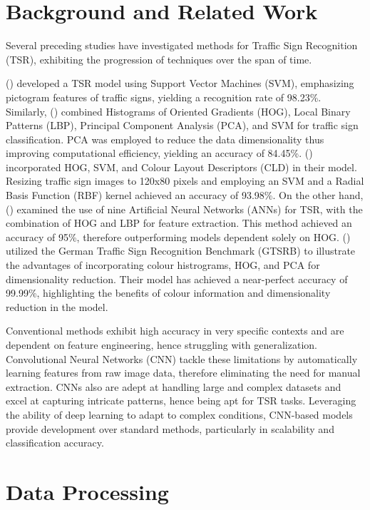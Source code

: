 \documentclass{article} %
\begin{document}
\section{Background and Related Work}
Several preceding studies have investigated methods for Traffic Sign Recognition (TSR), exhibiting the progression of techniques over the span of time. 

\citeauthor{Madani}(\citeyear{Madani}) developed a TSR model using Support Vector Machines (SVM), emphasizing pictogram features of traffic signs, yielding a recognition rate of 98.23\%. Similarly, \citeauthor{soni2019improving} (\citeyear{soni2019improving}) combined Histograms of Oriented Gradients (HOG), Local Binary Patterns (LBP), Principal Component Analysis (PCA), and SVM for traffic sign classification. PCA was employed to reduce the data dimensionality thus improving computational efficiency, yielding an accuracy of 84.45\%. \citeauthor{Namyang} (\citeyear{Namyang}) incorporated HOG, SVM, and Colour Layout Descriptors (CLD) in their model. Resizing traffic sign images to 120x80 pixels and employing an SVM and a Radial Basis Function (RBF) kernel achieved an accuracy of 93.98\%. On the other hand, \citeauthor{kerim} (\citeauthor{kerim}) examined the use of nine Artificial Neural Networks (ANNs) for TSR, with the combination of HOG and LBP for feature extraction. This method achieved an accuracy of 95\%, therefore outperforming models dependent solely on HOG. \citeauthor{li} (\citeyear{li}) utilized the German Traffic Sign Recognition Benchmark (GTSRB) to illustrate the advantages of incorporating colour histrograms, HOG, and PCA for dimensionality reduction. Their model has achieved a near-perfect accuracy of 99.99\%, highlighting the benefits of colour information and dimensionality reduction in the model.

Conventional methods exhibit high accuracy in very specific contexts and are dependent on feature engineering, hence struggling with generalization. Convolutional Neural Networks (CNN) tackle these limitations by automatically learning features from raw image data, therefore eliminating the need for manual extraction. CNNs also are adept at handling large and complex datasets and excel at capturing intricate patterns, hence being apt for TSR tasks. Leveraging the ability of deep learning to adapt to complex conditions, CNN-based models provide development over standard methods, particularly in scalability and classification accuracy. 

\section{Data Processing}
\end{document}
